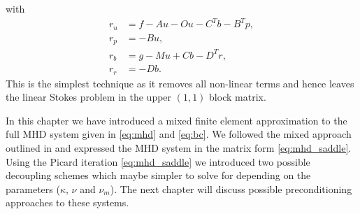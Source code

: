 with
\begin{align*}
r_u &= f- Au -O u - C^T b- B^T p,\\[0.1cm]
r_p &=-B u,\\[0.1cm]
r_b &=g-Mu+Cb-D^T r,\\[0.1cm]
r_r &=-D b.
\end{align*}
This is the simplest technique as it removes all non-linear terms and hence leaves the linear Stokes problem in the upper $(1,1)$ block matrix.

In this chapter we have introduced a mixed finite element approximation to the full MHD system given in \eqref{eq:mhd} and \eqref{eq:bc}. We followed the mixed approach outlined in \cite{schotzau2004mixed} and expressed the MHD system in the matrix form \eqref{eq:mhd_saddle}. Using the Picard iteration  \eqref{eq:mhd_saddle} we introduced two possible decoupling schemes which maybe simpler to solve for depending on the parameters ($\kappa$, $\nu$ and $\nu_m$). The next chapter will discuss possible preconditioning approaches to these systems.